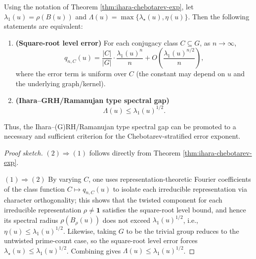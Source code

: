 \begin{corollary}\label{cor:ihara-chebotarev-grh-criterion}
Using the notation of Theorem \ref{thm:ihara-chebotarev-exp}, let
\(
\lambda_1(u)=\rho(B(u))
\)
and
\(
\Lambda(u)=\max\{\lambda_\star(u),\eta(u)\}
\).
Then the following statements are equivalent:
\begin{enumerate}
  \item \textbf{(Square-root level error)}
  For each conjugacy class \(C\subseteq G\), as \(n\to\infty\),
  \[
  q_{n,C}(u)=\frac{|C|}{|G|}\cdot\frac{\lambda_1(u)^n}{n}
  +O\!\left(\frac{\lambda_1(u)^{n/2}}{n}\right),
  \]
  where the error term is uniform over \(C\) (the constant may depend on \(u\) and the underlying graph/kernel).
  \item \textbf{(Ihara--GRH/Ramanujan type spectral gap)}
  \[
  \Lambda(u)\le \lambda_1(u)^{1/2}.
  \]
\end{enumerate}
Thus, the Ihara--(G)RH/Ramanujan type spectral gap can be promoted to a necessary and sufficient criterion for the Chebotarev-stratified error exponent.
\end{corollary}
\begin{proof}[Proof sketch]
\((2)\Rightarrow(1)\) follows directly from Theorem \ref{thm:ihara-chebotarev-exp}.
\par
\((1)\Rightarrow(2)\) By varying \(C\), one uses representation-theoretic Fourier coefficients of the class function \(C\mapsto q_{n,C}(u)\) to isolate each irreducible representation via character orthogonality; this shows that the twisted component for each irreducible representation \(\rho\neq\mathbf 1\) satisfies the square-root level bound, and hence its spectral radius \(\rho(B_\rho(u))\) does not exceed \(\lambda_1(u)^{1/2}\), i.e., \(\eta(u)\le\lambda_1(u)^{1/2}\). Likewise, taking \(G\) to be the trivial group reduces to the untwisted prime-count case, so the square-root level error forces \(\lambda_\star(u)\le\lambda_1(u)^{1/2}\). Combining gives \(\Lambda(u)\le\lambda_1(u)^{1/2}\). \qedhere
\end{proof}

\endinput
